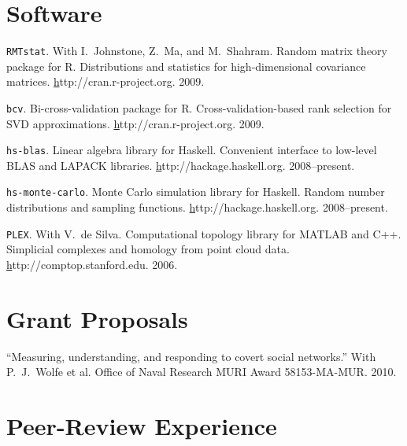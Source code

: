 \documentclass[overlapped,line,letterpaper]{res}
\begin{document}
\begin{resume}


\section{\bf Software}

{\texttt{RMTstat}}. With I.\ Johnstone, Z.\ Ma, and M.\ Shahram.
Random matrix theory package for R.
Distributions and statistics for high-dimensional covariance matrices.
\href{http://cran.r-project.org/web/packages/RMTstat/index.html}http://cran.r-project.org.  2009.

{\texttt{bcv}}.
Bi-cross-validation package for R.
Cross-validation-based rank selection for SVD approximations.
\href{http://cran.r-project.org/web/packages/bcv/index.html}http://cran.r-project.org.  2009.

{\texttt{hs-blas}}.
Linear algebra library for Haskell.
Convenient interface to low-level BLAS and LAPACK libraries.
\href{http://hackage.haskell.org/cgi-bin/hackage-scripts/package/blas}http://hackage.haskell.org.  2008--present.

{\texttt{hs-monte-carlo}}.
Monte Carlo simulation library for Haskell.  Random number distributions
and sampling functions.
\href{http://hackage.haskell.org/cgi-bin/hackage-scripts/package/monte-carlo}http://hackage.haskell.org.  2008--present.

{\texttt{PLEX}}. With V.\ de Silva.
Computational topology library for \textsc{MATLAB} and C++.
Simplicial complexes and homology from point cloud data.
\href{http://comptop.stanford.edu/programs/plex.html}http://comptop.stanford.edu.  2006.



\section{\bf Grant Proposals}

``Measuring, understanding, and responding to covert social networks.''
With P.\ J.\ Wolfe et al.
Office of Naval Research MURI Award 58153-MA-MUR.
2010.


\section{\bf Peer-Review Experience}


\end{resume}
\end{document}
